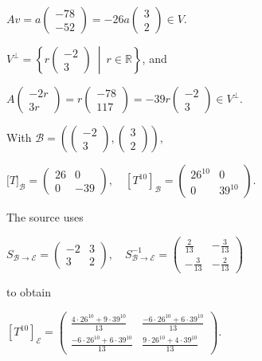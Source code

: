 \(Av = a\begin{pmatrix}
{- 78} \\
{- 52}
\end{pmatrix} = - 26a\begin{pmatrix}
3 \\
2
\end{pmatrix} \in V.\)

\(V^{\perp} = \left\{ r\begin{pmatrix}
{- 2} \\
3
\end{pmatrix}\  \middle| \ r \in \mathbb{R} \right\}\), and

\(A\begin{pmatrix}
{- 2r} \\
{3r}
\end{pmatrix} = r\begin{pmatrix}
{- 78} \\
117
\end{pmatrix} = - 39r\begin{pmatrix}
{- 2} \\
3
\end{pmatrix} \in V^{\perp}.\)

With \(\mathcal{B} = \left( {\begin{pmatrix}
{- 2} \\
3
\end{pmatrix},\begin{pmatrix}
3 \\
2
\end{pmatrix}} \right)\),

\(\lbrack T\rbrack_{\mathcal{B}} = \begin{pmatrix}
26 & 0 \\
0 & {- 39}
\end{pmatrix},\quad\left\lbrack T^{10} \right\rbrack_{\mathcal{B}} = \begin{pmatrix}
26^{10} & 0 \\
0 & 39^{10}
\end{pmatrix}.\)

The source uses

\(S_{\mathcal{B}\rightarrow\mathcal{E}} = \begin{pmatrix}
{- 2} & 3 \\
3 & 2
\end{pmatrix},\quad S_{\mathcal{B}\rightarrow\mathcal{E}}^{- 1} = \begin{pmatrix}
\frac{2}{13} & {- \frac{3}{13}} \\
{- \frac{3}{13}} & {- \frac{2}{13}}
\end{pmatrix}\)

to obtain

\(\left\lbrack T^{10} \right\rbrack_{\mathcal{E}} = \begin{pmatrix}
\frac{4 \cdot 26^{10} + 9 \cdot 39^{10}}{13} & \frac{- 6 \cdot 26^{10} + 6 \cdot 39^{10}}{13} \\
\frac{- 6 \cdot 26^{10} + 6 \cdot 39^{10}}{13} & \frac{9 \cdot 26^{10} + 4 \cdot 39^{10}}{13}
\end{pmatrix}.\)
